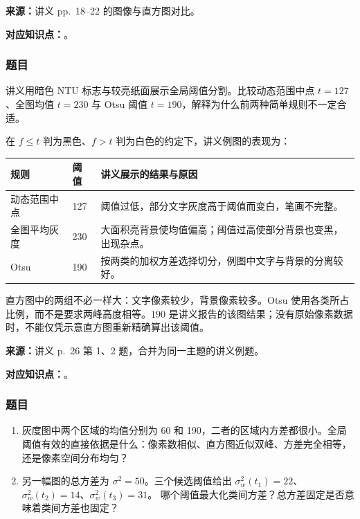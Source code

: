 
\textbf{来源：}讲义 pp.~18--22 的图像与直方图对比。

\textbf{对应知识点：}。

\subsubsection*{题目}

讲义用暗色 NTU 标志与较亮纸面展示全局阈值分割。比较动态范围中点 $t=127$、全图均值 $t=230$ 与 Otsu 阈值 $t=190$，解释为什么前两种简单规则不一定合适。

\begin{checkedsolution}
在 $f\le t$ 判为黑色、$f>t$ 判为白色的约定下，讲义例图的表现为：
\begin{center}
\begin{tabularx}{\textwidth}{@{}p{3.0cm}p{1.35cm}X@{}}
  \toprule
  规则 & 阈值 & 讲义展示的结果与原因 \\
  \midrule
  动态范围中点 & 127 & 阈值过低，部分文字灰度高于阈值而变白，笔画不完整。\\
  全图平均灰度 & 230 & 大面积亮背景使均值偏高；阈值过高使部分背景也变黑，出现杂点。\\
  Otsu & 190 & 按两类的加权方差选择切分，例图中文字与背景的分离较好。\\
  \bottomrule
\end{tabularx}
\end{center}
直方图中的两组不必一样大：文字像素较少，背景像素较多。Otsu 使用各类所占比例，而不是要求两峰高度相等。$190$ 是讲义报告的该图结果；没有原始像素数据时，不能仅凭示意直方图重新精确算出该阈值。
\end{checkedsolution}


\textbf{来源：}讲义 p.~26 第 1、2 题，合并为同一主题的讲义例题。

\textbf{对应知识点：}。

\subsubsection*{题目}

\begin{enumerate}[label=(\alph*)]
  \item 灰度图中两个区域的均值分别为 60 和 190，二者的区域内方差都很小。全局阈值有效的直接依据是什么：像素数相似、直方图近似双峰、方差完全相等，还是像素空间分布均匀？
  \item 另一幅图的总方差为 $\sigma^2=50$。三个候选阈值给出
  $\sigma_w^2(t_1)=22$、$\sigma_w^2(t_2)=14$、$\sigma_w^2(t_3)=31$。
  哪个阈值最大化类间方差？总方差固定是否意味着类间方差也固定？
\end{enumerate}

